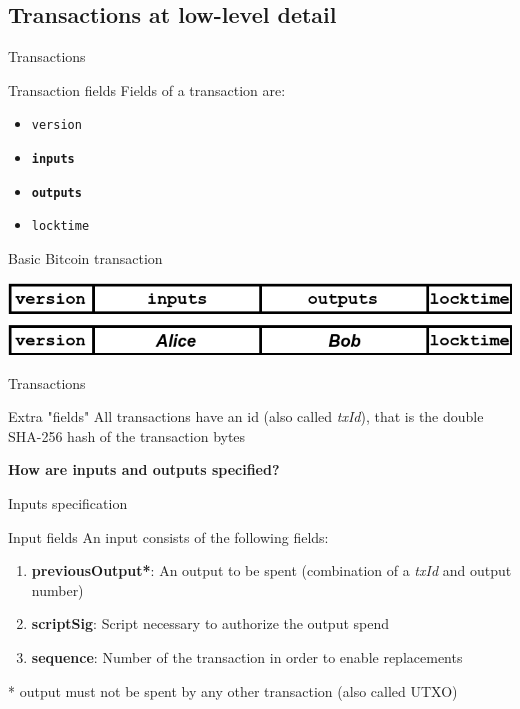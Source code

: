 \documentclass{beamer}
\begin{document}
\subsection{Transactions at low-level detail}
\begin{frame}{Transactions}
  \begin{block}{Transaction fields}
   Fields of a transaction are:
   \begin{itemize}
    \item \texttt{version}
    \item \textbf{\texttt{inputs}}
    \item \textbf{\texttt{outputs}}
    \item \texttt{locktime}
   \end{itemize}
  \end{block}
  \begin{exampleblock}{Basic Bitcoin transaction}
   \begin{center}
    \includegraphics[width=\textwidth, height=0.8\textheight, keepaspectratio]{img/basic_tx.png}
   \end{center}
  \end{exampleblock}
\end{frame}
\begin{frame}{Transactions}
  \begin{block}{Extra "fields"}
   All transactions have an id (also called \textit{txId}), that is the
   double SHA-256 hash of the transaction bytes
  \end{block}
\end{frame}
\begin{frame}
 \begin{center}
  \textbf{How are inputs and outputs specified?}
 \end{center}
\end{frame}
\begin{frame}{Inputs specification}
 \begin{block}{Input fields}
  An input consists of the following fields:
  \begin{enumerate}
   \item \textbf{previousOutput*}: An output to be spent (combination of a \textit{txId} and output number)
   \item \textbf{scriptSig}: Script necessary to authorize the output spend
   \item \textbf{sequence}: Number of the transaction in order to enable replacements
  \end{enumerate}
  * output must not be spent by any other transaction (also called UTXO)
 \end{block}
\end{frame}
\end{document}
